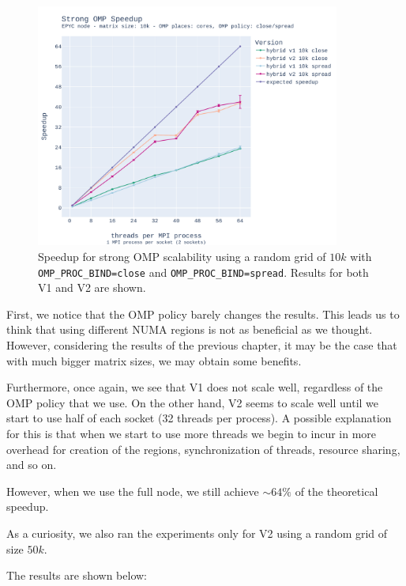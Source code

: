 \documentclass{report}
\begin{document}
\begin{figure}[H]
\centering
\includegraphics[width=10cm, height=8cm]{./images/strong_OMP_epyc_hybrid_grid_010k_speedup.pdf}
\caption{\label{fig:strongomp10kspeedupepyc} Speedup for strong OMP scalability using a random 
grid of $10k$ with \texttt{OMP\_PROC\_BIND=close} and \texttt{OMP\_PROC\_BIND=spread}. Results 
for both V1 and V2 are shown.}
\end{figure}

First, we notice that the OMP policy barely changes the results. This leads us 
to think that using different NUMA regions is not as beneficial as we thought. 
However, considering the results of the previous chapter, it may be the case 
that with much bigger matrix sizes, we may obtain some benefits.

Furthermore, once again, we see that V1 does not scale well, regardless of the 
OMP policy that we use. On the other hand, V2 seems to scale well until 
we start to use half of each socket (32 threads per process). A possible 
explanation for this is that when we start to use more threads we begin to 
incur in more overhead for creation of the regions, synchronization of threads, 
resource sharing, and so on. 

However, when we use the full node, we still achieve $\sim 64\%$ of the 
theoretical speedup.

As a curiosity, we also ran the experiments only for V2 using a random grid 
of size $50k$. 

The results are shown below:
\end{document}

